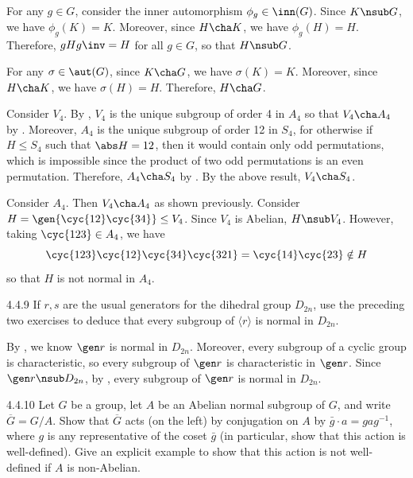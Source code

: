 \begin{solenum}[spsol]
	\item For any $g \in G$, consider the inner automorphism $\phi_g \in \inn(G)$.
	Since $K \nsub G$, we have $\phi_g(K) = K$.
	Moreover, since $H \cha K$, we have $\phi_g(H) = H$.
	Therefore, $gHg\inv = H$ for all $g \in G$, so that $H \nsub G$.
	\item For any $\sigma \in \aut(G)$, since $K \cha G$, we have $\sigma(K) = K$.
	Moreover, since $H \cha K$, we have $\sigma(H) = H$.
	Therefore, $H \cha G$. 
	
	Consider $V_4$.
	By , $V_4$ is the unique subgroup of order 4 in $A_4$ so that $V_4 \cha A_4$ by .
	Moreover, $A_4$ is the unique subgroup of order 12 in $S_4$, for otherwise if $H \leq S_4$ such that $\abs H = 12$, then it would contain only odd permutations, which is impossible since the product of two odd permutations is an even permutation.
	Therefore, $A_4 \cha S_4$ by .
	By the above result, $V_4 \cha S_4$.
	\item Consider $A_4$.
	Then $V_4 \cha A_4$ as shown previously.
	Consider $H = \gen{\cyc{1 2}\cyc{3 4}} \leq V_4$.
	Since $V_4$ is Abelian, $H \nsub V_4$.
	However, taking $\cyc{1 2 3} \in A_4$, we have
	\[
		\cyc{1 2 3}\cyc{1 2}\cyc{3 4}\cyc{3 2 1} = \cyc{1 4}\cyc{2 3} \notin H
	\]
	so that $H$ is not normal in $A_4$.
\end{solenum}

\begin{exercise}{4.4.9}
	If $r,s$ are the usual generators for the dihedral group $D_{2n}$, use the preceding two exercises to deduce that every subgroup of $\langle r\rangle$ is normal in $D_{2n}$.
\end{exercise}

\begin{sol}
	By , we know $\gen r$ is normal in $D_{2n}$.
	Moreover, every subgroup of a cyclic group is characteristic, so every subgroup of $\gen r$ is characteristic in $\gen r$.
	Since $\gen r \nsub D_{2n}$, by , every subgroup of $\gen r$ is normal in $D_{2n}$.
\end{sol}

\begin{exercise}{4.4.10}
	Let $G$ be a group, let $A$ be an Abelian normal subgroup of $G$, and write $\overline{G}=G/A$.
	Show that $\overline{G}$ acts (on the left) by conjugation on $A$ by $\bar g \cdot a = gag^{-1}$, where $g$ is any representative of the coset $\bar g$ (in particular, show that this action is well-defined).
	Give an explicit example to show that this action is not well-defined if $A$ is non-Abelian.
\end{exercise}

